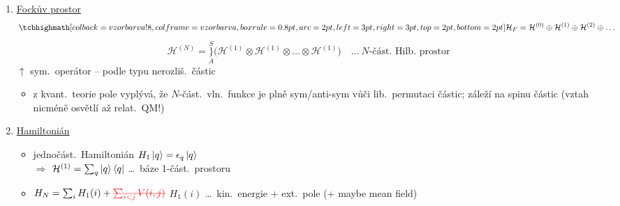 \begin{enumerate}[label=\arabic*)]
  \item \underline{Fockův prostor}
  \[
    \vzorec{\mathcal{H}_F = \mathcal{H}^{(0)}\oplus\mathcal{H}^{(1)}\oplus\mathcal{H}^{(2)}\oplus\dots}
  \]
  \[
    \mathcal{H}^{(N)} = \underset{A}{\overset{S}{\Big\}}}\big(\mathcal{H}^{(1)}\otimes\mathcal{H}^{(1)}\otimes\dots\otimes\mathcal{H}^{(1)}\big)
    \quad\dots\ N\text{-část.\ Hilb.\ prostor}
  \]
  \textcolor{NavyBlue}{$\uparrow$ sym.\ operátor -- podle typu nerozliš.\ částic}
  \begin{itemize}
    \item \textcolor{NavyBlue}{z kvant.\ teorie pole vyplývá, že $N$-část.\ vln.\ funkce je plně sym/anti-sym vůči lib.\ permutaci částic; záleží na spinu částic} \textcolor{OliveGreen}{(vztah nicméně osvětlí až relat.\ QM!)}
  \end{itemize}
  \item \underline{Hamiltonián}
  \begin{itemize}
    \item jednočást.\ Hamiltonián \quad $H_1\ket{q} = \epsilon_q\ket{q}$ \\
          $\Rightarrow$ $\mathcal{H}^{(1)} = \sum_q\ket{q}\bra{q}$ \quad \dots\ báze 1-část.\ prostoru
    \item $H_N = \sum_i H_1(i) + \textcolor{Red}{\text{\sout{$\sum_{i<j}V(i,j)$}}}$
          \qquad \textcolor{NavyBlue}{$H_1(i)$ \dots\ kin.\ energie + ext.\ pole (+ maybe mean field)}
  \end{itemize}
\end{enumerate}

